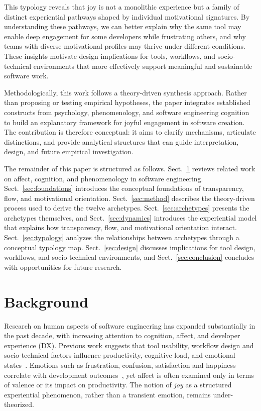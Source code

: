 \documentclass[12pt]{elsarticle}
\begin{document}
This typology reveals that joy is not a monolithic experience but a family of 
distinct experiential pathways shaped by individual motivational signatures. By 
understanding these pathways, we can better explain why the same tool may 
enable deep engagement for some developers while frustrating others, and why 
teams with diverse motivational profiles may thrive under different conditions. 
These insights motivate design implications for tools, workflows, and 
socio-technical environments that more effectively support meaningful and 
sustainable software work.

Methodologically, this work follows a theory-driven synthesis approach. Rather than proposing or testing empirical hypotheses, the paper integrates established constructs from psychology, phenomenology, and software engineering cognition to build an explanatory framework for joyful engagement in software creation. The contribution is therefore conceptual: it aims to clarify mechanisms, articulate distinctions, and provide analytical structures that can guide interpretation, design, and future empirical investigation.

\smallskip
The remainder of this paper is structured as follows. Sect.~\ref{sec:background} 
reviews related work on affect, cognition, and phenomenology in software 
engineering. Sect.~\ref{sec:foundations} introduces the conceptual foundations 
of transparency, flow, and motivational orientation. Sect.~\ref{sec:method} 
describes the theory-driven process used to derive the twelve archetypes. 
Sect.~\ref{sec:archetypes} presents the archetypes themselves, and 
Sect.~\ref{sec:dynamics} introduces the experiential model that explains how 
transparency, flow, and motivational orientation interact. Sect.~\ref{sec:typology} 
analyzes the relationships between archetypes through a conceptual typology map. 
Sect.~\ref{sec:design} discusses implications for tool design, workflows, and 
socio-technical environments, and Sect.~\ref{sec:conclusion} concludes with 
opportunities for future research.

\section{Background}\label{sec:background}
Research on human aspects of software engineering has expanded substantially 
in the past decade, with increasing attention to cognition, affect, and 
developer experience (DX). Previous work suggests that tool usability, workflow 
design and socio-technical factors influence productivity, cognitive load, and 
emotional states~\cite{graziotin2018devemotions, graziotin2015happy}. 
Emotions such as frustration, confusion, satisfaction and happiness correlate 
with development outcomes~\cite{muller2015stuck}, yet affect is often examined 
only in terms of valence or its impact on productivity. The notion of 
\emph{joy} as a structured experiential phenomenon, rather than a transient 
emotion, remains under-theorized.
\end{document}
